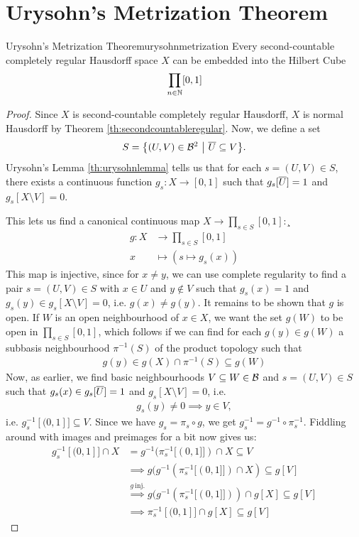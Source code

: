 \section{Urysohn's Metrization Theorem}
\begin{importantcorollary}{Urysohn's Metrization Theorem}{urysohnmetrization}
	Every second-countable completely regular Hausdorff space $X$ can be embedded into the Hilbert Cube
	\begin{align*}
		\prod_{n \in \mathbb{N}} [0,1]
	\end{align*}
\end{importantcorollary}
\begin{proof}
	Since $X$ is second-countable completely regular Hausdorff, $X$ is normal Hausdorff by Theorem \ref{th:secondcountableregular}. Now, we define a set
	\begin{align*}
		S = \qty{(U,V) \in \mathcal{B}^2 ~\middle|~\overline{{U}} \subseteq V}.
	\end{align*}
	Urysohn's Lemma \ref{th:urysohnlemma} tells us that for each $s = (U,V) \in S$, there exists a continuous function $g_s : X \to [0,1]$ such that $g_s[\overline{{U}}] = 1$ and $g_s[X \setminus V] = 0$.
	
	This lets us find a canonical continuous map $X \to \prod_{s \in S} [0,1]$:¸
	\begin{align*}
		g : 
		X &\to \prod_{s \in S} [0,1]\\
		x &\mapsto (s \mapsto g_s(x))
	\end{align*}
	This map is injective, since for $x \neq y$, we can use complete regularity to find a pair $s = (U,V) \in S$ with $x \in U$ and $y \notin V$ such that $g_s(x) = 1$ and $g_s(y) \in g_s[X \setminus V] = 0$, i.e. $g(x) \neq g(y)$.
	\newpar
	It remains to be shown that $g$ is open. If $W$ is an open neighbourhood of $x \in X$, we want the set $g(W)$ to be open in $\prod_{s \in S} [0,1]$, which follows if we can find for each $g(y) \in g(W)$ a subbasis neighbourhood $\pi^{-1}(S)$ of the product topology such that 
	\begin{align*}
		g(y) \in g(X) \cap \pi^{-1}(S) \subseteq g(W)
	\end{align*}
	Now, as earlier, we find basic neighbourhoods $V \subseteq W \in \mathcal{B}$ and $s = (U,V) \in S$ such that $g_s(x) \in g_s[\overline{{U}}] = 1$ and $g_s[X \setminus V] = 0$, i.e.
	\begin{align*}
		g_s(y) \neq 0 \implies y \in V,
	\end{align*} 
	i.e. $g_s^{-1}[(0,1]] \subseteq V$. Since we have $g_s = \pi_s \circ g$, we get $g_s^{-1} = g^{-1} \circ \pi_s^{-1}$. Fiddling around with images and preimages for a bit now gives us:
	\begin{align*}
		g_s^{-1}[(0,1]] \cap X &= g^{-1}(\pi_s^{-1}[(0,1]]) \cap X \subseteq V\\
		&\implies g(g^{-1}(\pi_s^{-1}[(0,1]]) \cap X) \subseteq g[V]\\
		&\stackrel{g~ \text{inj.}}{\implies} g(g^{-1}(\pi_s^{-1}[(0,1]])) \cap g[X] \subseteq g[V]\\
		&\implies \pi_s^{-1}[(0,1]] \cap g[X] \subseteq g[V]
	\end{align*}
\end{proof}

